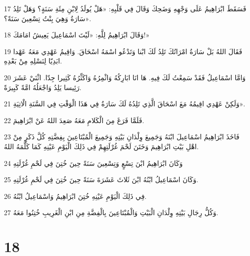 \par 17 فَسَقَطَ ابْرَاهِيمُ عَلَى وَجْهِهِ وَضَحِكَ وَقَالَ فِي قَلْبِهِ: «هَلْ يُولَدُ لِابْنِ مِئَةِ سَنَةٍ؟ وَهَلْ تَلِدُ سَارَةُ وَهِيَ بِنْتُ تِسْعِينَ سَنَةً؟».
\par 18 وَقَالَ ابْرَاهِيمُ لِلَّهِ: «لَيْتَ اسْمَاعِيلَ يَعِيشُ امَامَكَ!»
\par 19 فَقَالَ اللهُ بَلْ سَارَةُ امْرَاتُكَ تَلِدُ لَكَ ابْنا وَتَدْعُو اسْمَهُ اسْحَاقَ. وَاقِيمُ عَهْدِي مَعَهُ عَهْدا ابَدِيّا لِنَسْلِهِ مِنْ بَعْدِهِ.
\par 20 وَامَّا اسْمَاعِيلُ فَقَدْ سَمِعْتُ لَكَ فِيهِ. هَا انَا ابَارِكُهُ وَاثْمِرُهُ وَاكَثِّرُهُ كَثِيرا جِدّا. اثْنَيْ عَشَرَ رَئِيسا يَلِدُ وَاجْعَلُهُ امَّةً كَبِيرَةً.
\par 21 وَلَكِنْ عَهْدِي اقِيمُهُ مَعَ اسْحَاقَ الَّذِي تَلِدُهُ لَكَ سَارَةُ فِي هَذَا الْوَقْتِ فِي السَّنَةِ الْاتِيَةِ».
\par 22 فَلَمَّا فَرَغَ مِنَ الْكَلامِ مَعَهُ صَعِدَ اللهُ عَنْ ابْرَاهِيمَ.
\par 23 فَاخَذَ ابْرَاهِيمُ اسْمَاعِيلَ ابْنَهُ وَجَمِيعَ وِلْدَانِ بَيْتِهِ وَجَمِيعَ الْمُبْتَاعِينَ بِفِضَّتِهِ كُلَّ ذَكَرٍ مِنْ اهْلِ بَيْتِ ابْرَاهِيمَ وَخَتَنَ لَحْمَ غُرْلَتِهِمْ فِي ذَلِكَ الْيَوْمِ عَيْنِهِ كَمَا كَلَّمَهُ اللهُ.
\par 24 وَكَانَ ابْرَاهِيمُ ابْنَ تِسْعٍ وَتِسْعِينَ سَنَةً حِينَ خُتِنَ فِي لَحْمِ غُرْلَتِهِ
\par 25 وَكَانَ اسْمَاعِيلُ ابْنُهُ ابْنَ ثَلاثَ عَشَرَةَ سَنَةً حِينَ خُتِنَ فِي لَحْمِ غُرْلَتِهِ.
\par 26 فِي ذَلِكَ الْيَوْمِ عَيْنِهِ خُتِنَ ابْرَاهِيمُ وَاسْمَاعِيلُ ابْنُهُ.
\par 27 وَكُلُّ رِجَالِ بَيْتِهِ وِلْدَانِ الْبَيْتِ وَالْمُبْتَاعِينَ بِالْفِضَّةِ مِنِ ابْنِ الْغَرِيبِ خُتِنُوا مَعَهُ.

\chapter{18}

